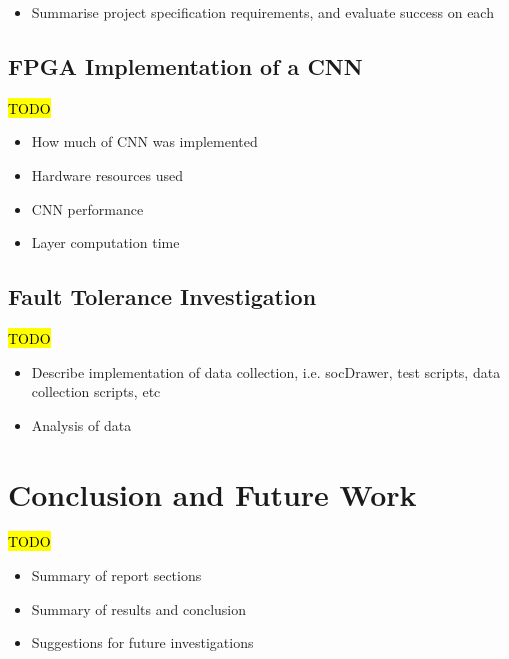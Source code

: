 \documentclass[12pt]{article}
\begin{document}
\begin{itemize}
\item Summarise project specification requirements, and evaluate success on each
\end{itemize}

\subsection{FPGA Implementation of a CNN}
\label{sec:Eval-FPGAImplOfCnn}


\hl{TODO}

\begin{itemize}
\item How much of CNN was implemented
\item Hardware resources used
\item CNN performance
\item Layer computation time
\end{itemize}

\subsection{Fault Tolerance Investigation}
\label{sec:Eval-FaultTolInv}


\hl{TODO}

\begin{itemize}
\item Describe implementation of data collection, i.e. socDrawer, test scripts, data collection scripts, etc
\item Analysis of data
\end{itemize}

\newpage

\section{Conclusion and Future Work}
\label{sec:Conclusion}


\hl{TODO}

\begin{itemize}
\item Summary of report sections
\item Summary of results and conclusion
\item Suggestions for future investigations
\end{itemize}

\newpage



\end{document}
